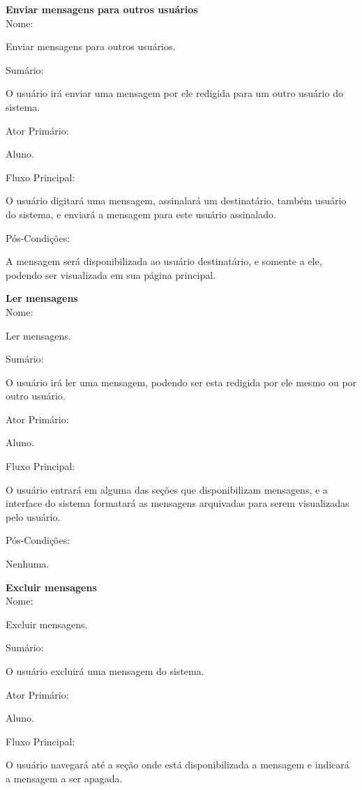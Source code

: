 \documentclass[11pt]{article}
\begin{document}
\textbf{Enviar mensagens para outros usuários}
\\

Nome:

      Enviar mensagens para outros usuários. 

Sumário:

      O usuário irá enviar uma mensagem por ele redigida para um outro usuário do sistema. 

Ator Primário:

      Aluno. 

Fluxo Principal:

      O usuário digitará uma mensagem, assinalará um destinatário, também usuário do sistema, e enviará a mensagem para este usuário assinalado. 

Pós-Condições:

      A mensagem será disponibilizada ao usuário destinatário, e somente a ele, podendo ser visualizada em sua página principal. 

\textbf{Ler mensagens}
\\

Nome:

      Ler mensagens. 

Sumário:

      O usuário irá ler uma mensagem, podendo ser esta redigida por ele mesmo ou por outro usuário. 

Ator Primário:

      Aluno. 

Fluxo Principal:

      O usuário entrará em alguma das seções que disponibilizam mensagens, e a interface do sistema formatará as mensagens arquivadas para serem visualizadas pelo usuário. 

Pós-Condições:

      Nenhuma. 

\textbf{Excluir mensagens}
\\

Nome:

      Excluir mensagens. 

Sumário:

      O usuário excluirá uma mensagem do sistema. 

Ator Primário:

      Aluno. 

Fluxo Principal:

      O usuário navegará até a seção onde está disponibilizada a mensagem e indicará a mensagem a ser apagada. 
\end{document}
